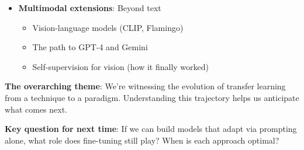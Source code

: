 \documentclass{article}
\begin{document}
\begin{itemize}
\item \textbf{Multimodal extensions}: Beyond text
\begin{itemize}
\item Vision-language models (CLIP, Flamingo)
\item The path to GPT-4 and Gemini
\item Self-supervision for vision (how it finally worked)
\end{itemize}
\end{itemize}

\vspace{0.5cm}

\textbf{The overarching theme}: We're witnessing the evolution of transfer learning from a technique to a paradigm. Understanding this trajectory helps us anticipate what comes next.

\vspace{0.3cm}

\textbf{Key question for next time}: If we can build models that adapt via prompting alone, what role does fine-tuning still play? When is each approach optimal?
\end{document}

